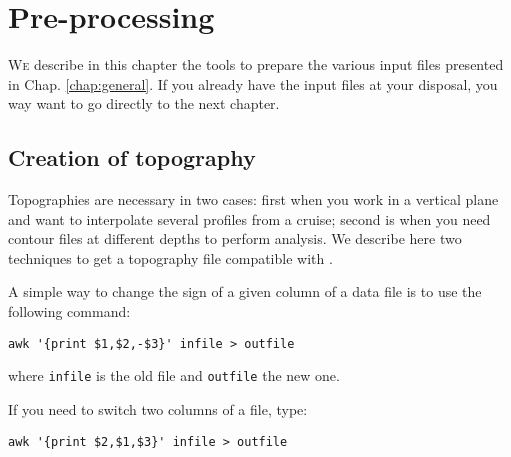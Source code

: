 \chapter{Pre-processing \label{Preprocessing}}
\vspace*{-1cm}
\lettrine[lines=2, loversize=-0.1, lraise=0.1]{W}{e} describe in this chapter the tools to prepare the various input files presented in Chap. \ref{chap:general}. If you already have the input files at your disposal, you way want to go directly to the next chapter.

\minitoc

\section{Creation of topography\label{sec:howtotopo}}

Topographies are necessary in two cases: first when you work in a vertical plane and want to interpolate several profiles from a cruise; second is when you need contour files at different depths to perform analysis. We describe here two techniques to get a topography file compatible with \diva.


\begin{center}
\end{center}

\btips
A simple way to change the sign of a given column of a data file is to use the following command:
\begin{verbatim}
awk '{print $1,$2,-$3}' infile > outfile
\end{verbatim}
where \texttt{infile} is the old file and \texttt{outfile} the new one.

If you need to switch two columns of a file, type:
\begin{verbatim}
awk '{print $2,$1,$3}' infile > outfile
\end{verbatim}
\etips



